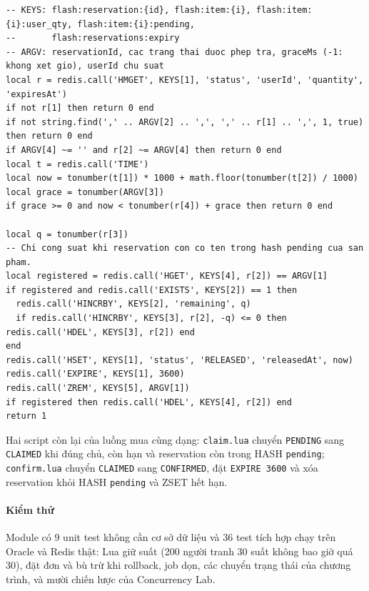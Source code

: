 \reportblockspace{72pt}
\begin{lstlisting}[language={[5.3]Lua}, caption={release.lua: trả suất đúng một lần (Cancel, bù trừ)}, label={lst:cc-release}]
-- KEYS: flash:reservation:{id}, flash:item:{i}, flash:item:{i}:user_qty, flash:item:{i}:pending,
--       flash:reservations:expiry
-- ARGV: reservationId, cac trang thai duoc phep tra, graceMs (-1: khong xet gio), userId chu suat
local r = redis.call('HMGET', KEYS[1], 'status', 'userId', 'quantity', 'expiresAt')
if not r[1] then return 0 end
if not string.find(',' .. ARGV[2] .. ',', ',' .. r[1] .. ',', 1, true) then return 0 end
if ARGV[4] ~= '' and r[2] ~= ARGV[4] then return 0 end
local t = redis.call('TIME')
local now = tonumber(t[1]) * 1000 + math.floor(tonumber(t[2]) / 1000)
local grace = tonumber(ARGV[3])
if grace >= 0 and now < tonumber(r[4]) + grace then return 0 end

local q = tonumber(r[3])
-- Chi cong suat khi reservation con co ten trong hash pending cua san pham.
local registered = redis.call('HGET', KEYS[4], r[2]) == ARGV[1]
if registered and redis.call('EXISTS', KEYS[2]) == 1 then
  redis.call('HINCRBY', KEYS[2], 'remaining', q)
  if redis.call('HINCRBY', KEYS[3], r[2], -q) <= 0 then redis.call('HDEL', KEYS[3], r[2]) end
end
redis.call('HSET', KEYS[1], 'status', 'RELEASED', 'releasedAt', now)
redis.call('EXPIRE', KEYS[1], 3600)
redis.call('ZREM', KEYS[5], ARGV[1])
if registered then redis.call('HDEL', KEYS[4], r[2]) end
return 1
\end{lstlisting}

Hai script còn lại của luồng mua cùng dạng: \texttt{claim.lua} chuyển \texttt{PENDING} sang \texttt{CLAIMED} khi đúng chủ, còn hạn và reservation còn trong HASH \texttt{pending}; \texttt{confirm.lua} chuyển \texttt{CLAIMED} sang \texttt{CONFIRMED}, đặt \texttt{EXPIRE 3600} và xóa reservation khỏi HASH \texttt{pending} và ZSET hết hạn.

\paragraph{Kiểm thử}
Module có 9 unit test không cần cơ sở dữ liệu và 36 test tích hợp chạy trên Oracle và Redis thật: Lua giữ suất (200 người tranh 30 suất không bao giờ quá 30), đặt đơn và bù trừ khi rollback, job dọn, các chuyển trạng thái của chương trình, và mười chiến lược của Concurrency Lab.

